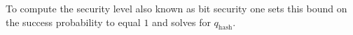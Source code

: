 To compute the security level also known as bit security one sets this bound on
the success probability to 
equal $1$ and solves for $q_{\text{hash}}$.

%
%
%
% 	
% 
% 
% 

